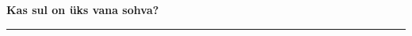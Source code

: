 \documentclass[10pt]{book}
\begin{document}
{
  \samepage
  \raggedbottom
  \raggedright
  \sloppy


  \vspace{0.2in}

  \noindent\begin{minipage}{.1\textwidth}
    \hfill\vspace{0.1in}
  \end{minipage}%
  \noindent\begin{minipage}{.8\textwidth}
    \centering
    \bfseries
    \large Kas sul on \"uks vana sohva?
  \end{minipage}%
  \noindent\begin{minipage}{.1\textwidth}
      \hfill\vspace{0.1in}
  \end{minipage}

  \nopagebreak[4]
  \vspace{0.1in}
  \nopagebreak[4]
  \hrule height 0.05ex
  \nopagebreak[4]
  \vspace{-0.05in}




}
\end{document}
